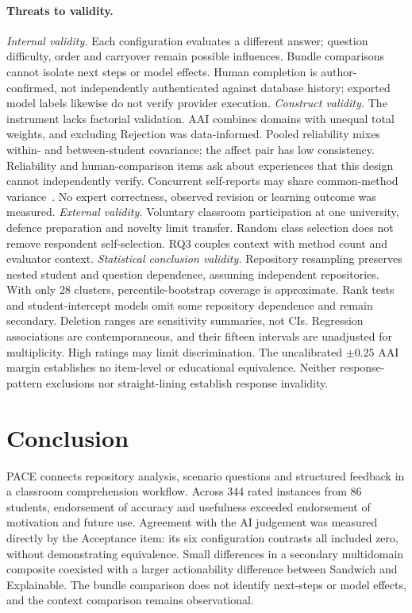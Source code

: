 \documentclass[runningheads]{llncs}
\begin{document}
\paragraph{Threats to validity.}
\emph{Internal validity.} Each configuration evaluates a different answer; question difficulty, order and carryover remain possible influences. Bundle comparisons cannot isolate next steps or model effects. Human completion is author-confirmed, not independently authenticated against database history; exported model labels likewise do not verify provider execution.
\emph{Construct validity.} The instrument lacks factorial validation. AAI combines domains with unequal total weights, and excluding Rejection was data-informed. Pooled reliability mixes within- and between-student covariance; the affect pair has low consistency. Reliability and human-comparison items ask about experiences that this design cannot independently verify. Concurrent self-reports may share common-method variance~\cite{podsakoff2003common}. No expert correctness, observed revision or learning outcome was measured.
\emph{External validity.} Voluntary classroom participation at one university, defence preparation and novelty limit transfer. Random class selection does not remove respondent self-selection. RQ3 couples context with method count and evaluator context.
\emph{Statistical conclusion validity.} Repository resampling preserves nested student and question dependence, assuming independent repositories. With only 28 clusters, percentile-bootstrap coverage is approximate. Rank tests and student-intercept models omit some repository dependence and remain secondary. Deletion ranges are sensitivity summaries, not CIs. Regression associations are contemporaneous, and their fifteen intervals are unadjusted for multiplicity. High ratings may limit discrimination. The uncalibrated $\pm0.25$ AAI margin establishes no item-level or educational equivalence. Neither response-pattern exclusions nor straight-lining establish response invalidity.

\section{Conclusion}
\label{sec:conclusion}

PACE connects repository analysis, scenario questions and structured feedback in a classroom comprehension workflow. Across 344 rated instances from 86 students, endorsement of accuracy and usefulness exceeded endorsement of motivation and future use. Agreement with the AI judgement was measured directly by the Acceptance item: its six configuration contrasts all included zero, without demonstrating equivalence. Small differences in a secondary multidomain composite coexisted with a larger actionability difference between Sandwich and Explainable. The bundle comparison does not identify next-steps or model effects, and the context comparison remains observational.
\end{document}
